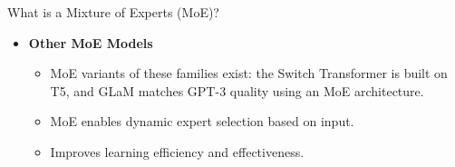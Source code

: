 \begin{frame}[allowframebreaks]{What is a Mixture of Experts (MoE)?}
\begin{itemize}
\begin{figure}[h]
            {Source: \href{https://www.mdpi.com/2076-3417/14/14/6171}{Zheng et al. (2024)}}
        \end{figure}
    \framebreak
        \item \textbf{Other MoE Models}
        \begin{itemize}
            \item MoE variants of these families exist: the Switch Transformer is built on T5, and GLaM matches GPT-3 quality using an MoE architecture.
            \item MoE enables dynamic expert selection based on input.
            \item Improves learning efficiency and effectiveness.
        \end{itemize}
    \end{itemize}
\end{frame}
